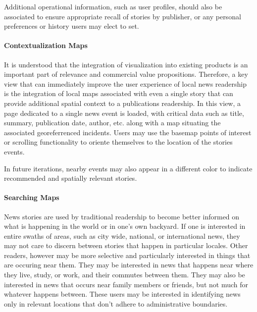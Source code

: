 Additional operational information, such as user profiles, should also be associated to ensure appropriate recall of stories by publisher, or any personal preferences or history users may elect to set.

\paragraph{Contextualization Maps}
It is understood that the integration of visualization into existing products is an important part of relevance and commercial value propositions\cite{Meeks2019}. Therefore, a key view that can immediately improve the user experience of local news readership is the integration of local maps associated with even a single story that can provide additional spatial context to a publications readership. %
In this view, a page dedicated to a single news event is loaded, with critical data such as title, summary, publication date, author, etc. along with a map situating the associated georeferrenced incidents. Users may use the basemap points of interest or scrolling functionality to oriente themselves to the location of the stories events.

In future iterations, nearby events may also appear in a different color to indicate recommended and spatially relevant stories.

\paragraph{Searching Maps}
News stories are used by traditional readership to become better informed on what is happening in the world or in one's own backyard. If one is interested in entire swaths of areas, such as city wide, national, or international news, they may not care to discern between stories that happen in particular locales. Other readers, however may be more selective and particularly interested in things that are occuring near them. They may be interested in news that happens near where they live, study, or work, and their commutes between them. They may also be interested in news that occurs near family members or friends, but not much for whatever happens between. These users may be interested in identifying news only in relevant locations that don't adhere to administrative boundaries.


